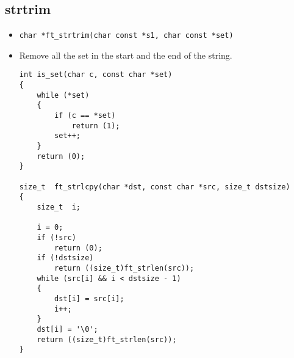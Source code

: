 \documentclass{article}
\begin{document}
	\subsection{strtrim}
		\begin{itemize}[label=$\rightarrow$]
			\item \texttt{char    *ft\_strtrim(char const *s1, char const *set) }
			\item Remove all the set in the start and the end of the string.
			\begin{verbatim}
int is_set(char c, const char *set)                                             
{                                                                               
    while (*set)                                                                
    {                                                                           
        if (c == *set)                                                          
            return (1);                                                         
        set++;                                                                  
    }                                                                           
    return (0);                                                                 
}                                                                               
                                                                                
size_t  ft_strlcpy(char *dst, const char *src, size_t dstsize)                  
{                                                                               
    size_t  i;                                                                  
                                                                                
    i = 0;                                                                      
    if (!src)                                                                   
        return (0);                                                             
    if (!dstsize)                                                               
        return ((size_t)ft_strlen(src));                                        
    while (src[i] && i < dstsize - 1)                                           
    {                                                                           
        dst[i] = src[i];                                                        
        i++;                                                                    
    }                                                                           
    dst[i] = '\0';                                                              
    return ((size_t)ft_strlen(src));                                            
}  


\end{verbatim}
\end{itemize}
\end{document}
